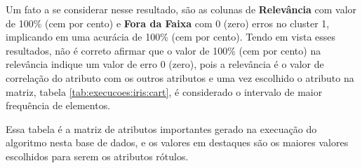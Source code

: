 
Um fato a se considerar nesse resultado, são as colunas de \textbf{Relevância} com valor de 100\% (cem por cento) e \textbf{Fora da Faixa} com 0 (zero) erros no cluster 1, implicando em uma acurácia de 100\% (cem por cento). Tendo em vista esses resultados, não é correto afirmar que o valor de   100\% (cem por cento) na relevância indique um valor de erro 0 (zero), pois a relevância é o valor de correlação do atributo com os outros atributos e uma vez escolhido o atributo na matriz, tabela \ref{tab:execucoes:iris:cart}, é considerado o intervalo de maior frequência de elementos.

Essa tabela é a matriz de atributos importantes gerado na execuação do algoritmo nesta base de dados, e os valores em destaques são os maiores valores escolhidos para serem os atributos rótulos.

\begin{table}[!h]
\centering
\caption{Matriz de Atributos Importantes do algoritmo Naive Bayes na base Iris}
\label{tab:execucoes:iris:cart}
\end{table}    


